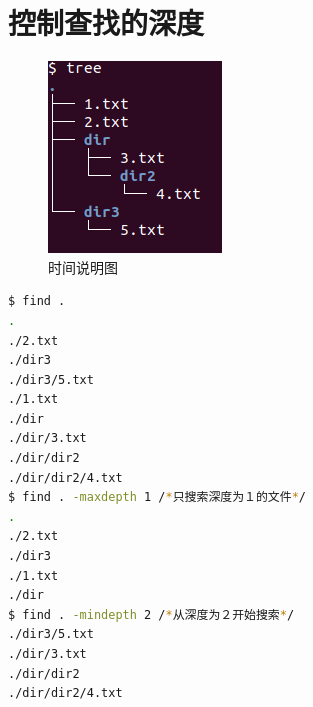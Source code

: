 \documentclass{article}
\begin{document}
\section{控制查找的深度}
\begin{figure}[H]
	\centering
	\includegraphics[scale=0.8]{pic4.png} \par
	\caption{时间说明图}
\end{figure}
\begin{lstlisting}[language=bash]
$ find .
.
./2.txt
./dir3
./dir3/5.txt
./1.txt
./dir
./dir/3.txt
./dir/dir2
./dir/dir2/4.txt
$ find . -maxdepth 1 /*只搜索深度为１的文件*/
.
./2.txt
./dir3
./1.txt
./dir
$ find . -mindepth 2 /*从深度为２开始搜索*/
./dir3/5.txt
./dir/3.txt
./dir/dir2
./dir/dir2/4.txt

\end{lstlisting}
\end{document}
